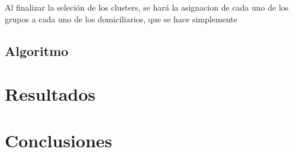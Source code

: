 \documentclass[runningheads]{llncs}
\begin{document}
Al finalizar la seleción de los clusters, se hará la asignacion de cada uno de los grupos a cada uno de los domiciliarios, que se hace simplemente 
\subsection{Algoritmo}
\section{Resultados}
\section{Conclusiones}
%
%
%
\renewcommand{\refname}{Referencias}


\end{document}
